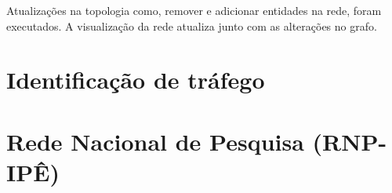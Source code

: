 Atualizações na topologia como, remover e adicionar entidades na rede, foram
executados.
A visualização da rede atualiza junto com as alterações no grafo.

\section{Identificação de tráfego}

\section{Rede Nacional de Pesquisa (RNP-IPÊ)}
